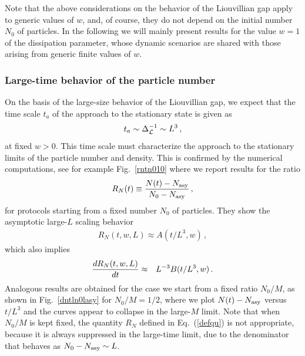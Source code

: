   Note that the above considerations on the behavior of the Liouvillian
  gap apply to generic values of $w$, and,  of course, they do not depend
  on the initial number $N_0$ of particles.  In the following we will
  mainly present results for the value $w=1$ of the dissipation
  parameter, whose dynamic scenarios are shared with those arising from
  generic finite values of $w$.
  
  \subsubsection{Large-time behavior of the particle number}
  \label{lasypgap}
  
  On the basis of the large-size behavior of the Liouvillian gap, we
  expect that the time scale $t_a$ of the approach to the stationary
  state is given as
  \begin{equation}
  t_a \sim \Delta_{\cal L}^{-1}\sim L^3\,,
  \label{timescaleasy}
  \end{equation}
  at fixed $w>0$. This time scale must characterize the approach to the
  stationary limits of the particle number and density.  This is
  confirmed by the numerical computations, see for example
  Fig.~\ref{rntn010} where we report results for the ratio
  \begin{equation}
    R_N(t)\equiv {N(t)-N_{\rm asy}\over N_0-N_{\rm asy}}\,,
      \label{defqu}
  \end{equation}
  for protocols starting from a fixed number $N_0$ of particles.  They
  show the asymptotic large-$L$ scaling behavior
  \begin{eqnarray}
    R_N(t,w,L) \approx A(t/L^3,w)\,,\label{scalbehasy}
  \end{eqnarray}
  which also implies
  \begin{eqnarray}
  {d R_N(t,w,L)\over dt} &\approx& L^{-3} B(t/L^3,w)\,.  \nonumber
  \end{eqnarray}
  Analogous results are obtained for the case we start from a fixed
  ratio $N_0/M$, as shown in Fig.~\ref{dntln0lasy} for $N_0/M=1/2$,
  where we plot $N(t)-N_{\rm asy}$ versus $t/L^3$ and the curves appear
  to collapse in the large-$M$ limit. Note that when $N_0/M$ is kept
  fixed, the quantity $R_N$ defined in Eq.~(\ref{defqu}) is not
  appropriate, because it is always suppressed in the large-time limit,
  due to the denominator that behaves as $N_0-N_{\rm asy}\sim L$.
  
